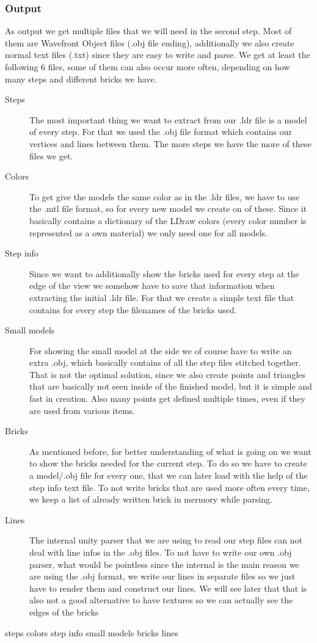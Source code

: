 \documentclass[11pt,a4paper]{article}
\begin{document}
	\subsubsection{Output}
	As output we get multiple files that we will need in the second step. Most of them are Wavefront Object files (.obj file ending), additionally we also create normal text files (.txt) since they are easy to write and  parse. We get at least the following 6 files, some of them can also occur more often, depending on how many steps and different bricks we have.
	\begin{description}
		\item[Steps]
		The most important thing we want to extract from our .ldr file is a model of every step. For that we used the .obj file format which contains our vertices and lines between them. The more steps we have the more of these files we get.
		\item[Colors]
		To get give the models the same color as in the .ldr files, we have to use the .mtl file format, so for every new model we create on of these. Since it basically contains a dictionary of the LDraw colors (every color number is represented as a own material) we only need one for all models.
		\item[Step info]
		Since we want to additionally show the bricks used for every step at the edge of the view we somehow have to save that information when extracting the initial .ldr file. For that we create a simple text file that contains for every step the filenames of the bricks used.
		\item[Small models]
		For showing the small model at the side we of course have to write an extra .obj, which basically contains of all the step files stitched together. That is not the optimal solution, since we also create points and triangles that are basically not seen inside of the finished model, but it is simple and fast in creation. Also many points get defined multiple times, even if they are used from various items.
		\item[Bricks]
		As mentioned before, for better understanding of what is going on we want to show the bricks needed for the current step. To do so we have to create a model/.obj file for every one, that we can later load with the help of the step info text file. To not write bricks that are used more often every time, we keep a list of already written brick in mermory while parsing.
		\item[Lines]
		The internal unity parser that we are using to read our step files can not deal with line infos in the .obj files. To not have to write our own .obj parser, what would be pointless since the internal  is the main reason we are using the .obj format, we write our lines in separate files so we just have to render them  and construct our lines. We will see later that that is also not a good alternative to have textures so we can actually see the edges of the bricks
	\end{description}
	steps
	colors
	step info
	small models
	bricks
	lines
	
\end{document}
